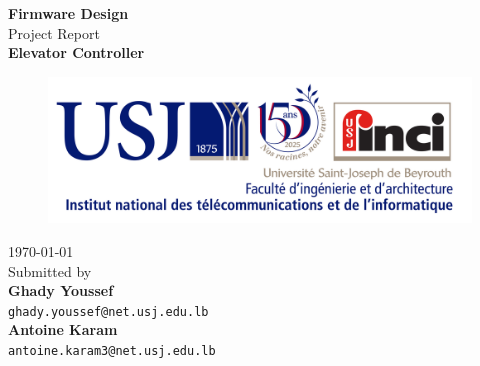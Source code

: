 \begin{titlepage}

    \vspace*{\fill}
    \begin{center}
        \textup{\large\textbf{Firmware Design}\\
            \small{Project Report}}\\[0.3in]

        \Large \textbf {Elevator Controller}\\[0.3in]

        \begin{figure}[h]
            \centering
            \includegraphics[width=0.65\linewidth]{assets/inci.png}
        \end{figure}

        \vspace{.5in}

        \normalsize\today\\
        Submitted by \\[0.2in]

        \textbf{Ghady Youssef}\\
        \texttt{ghady.youssef@net.usj.edu.lb}\\
        \vspace{.3in}
        \textbf{Antoine Karam}\\
        \texttt{antoine.karam3@net.usj.edu.lb}
    \end{center}
    \vspace*{\fill}

\end{titlepage}
